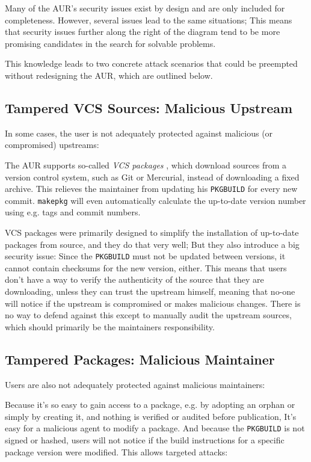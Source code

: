Many of the AUR's security issues exist by design and are only included for completeness. However, several issues lead to the same situations; This means that security issues further along the right of the diagram tend to be more promising candidates in the search for solvable problems.

This knowledge leads to two concrete attack scenarios that could be preempted without redesigning the AUR, which are outlined below.

\subsection*{Tampered VCS Sources: Malicious Upstream}
In some cases, the user is not adequately protected against malicious (or compromised) upstreams:

The AUR supports so-called \emph{VCS packages} \cite{wiki:VCSPackages}, which download sources from a version control system, such as Git or Mercurial, instead of downloading a fixed archive. This relieves the maintainer from updating his \texttt{PKGBUILD} for every new commit.
\texttt{makepkg} will even automatically calculate the up-to-date version number using e.g. tags and commit numbers.

VCS packages were primarily designed to simplify the installation of up-to-date packages from source, and they do that very well; But they also introduce a big security issue:
Since the \texttt{PKGBUILD} must not be updated between versions, it cannot contain checksums for the new version, either.
This means that users don't have a way to verify the authenticity of the source that they are downloading, unless they can trust the upstream himself, meaning that no-one will notice if the upstream is compromised or makes malicious changes. There is no way to defend against this except to manually audit the upstream sources, which should primarily be the maintainers responsibility.

\subsection*{Tampered Packages: Malicious Maintainer}
Users are also not adequately protected against malicious maintainers:

Because it's so easy to gain access to a package, e.g. by adopting an orphan or simply by creating it, and nothing is verified or audited before publication, It's easy for a malicious agent to modify a package.
And because the \texttt{PKGBUILD} is not signed or hashed, users will not notice if the build instructions for a specific package version were modified. This allows targeted attacks:

